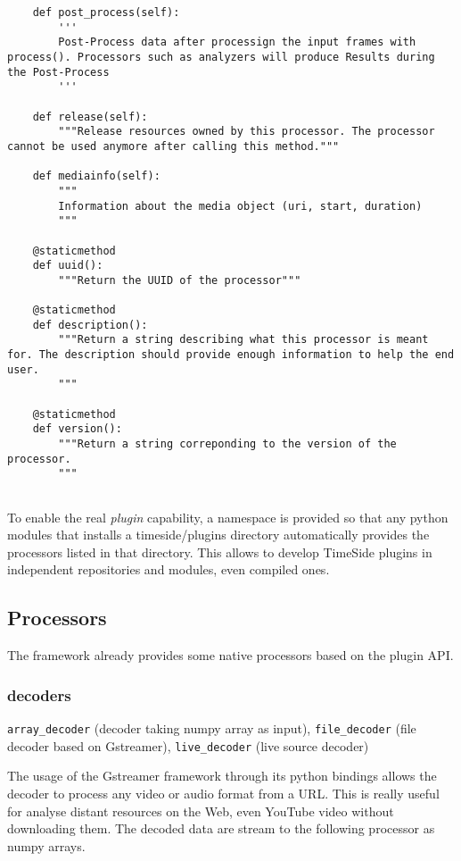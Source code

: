 \documentclass{article}
\begin{document}
\begin{lstlisting}
    def post_process(self):
        '''
        Post-Process data after processign the input frames with process(). Processors such as analyzers will produce Results during the Post-Process
        '''

    def release(self):
        """Release resources owned by this processor. The processor cannot be used anymore after calling this method."""

    def mediainfo(self):
        """
        Information about the media object (uri, start, duration)
        """

    @staticmethod
    def uuid():
        """Return the UUID of the processor"""

    @staticmethod
    def description():
        """Return a string describing what this processor is meant for. The description should provide enough information to help the end user.
        """
    
    @staticmethod
    def version():
        """Return a string correponding to the version of the processor.
        """
    
\end{lstlisting}

To enable the real \textit{plugin} capability, a namespace is provided so that any python modules that installs a timeside/plugins directory automatically provides the processors listed in that directory. This allows to develop TimeSide plugins in independent repositories and modules, even compiled ones.


\subsection{Processors}

The framework already provides some native processors based on the plugin API.

\subsubsection{decoders}

\verb|array_decoder| (decoder taking numpy array as input), \verb|file_decoder| (file decoder based on Gstreamer), \verb|live_decoder| (live source decoder)

The usage of the Gstreamer framework through its python bindings allows the decoder to process any video or audio format from a URL. This is really useful for analyse distant resources on the Web, even YouTube video without downloading them. The decoded data are stream to the following processor as numpy arrays.
\end{document}
